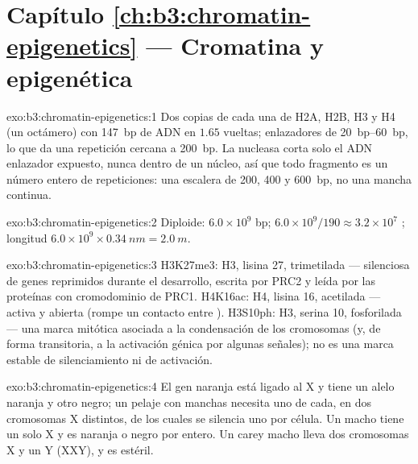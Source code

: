 \section*{Capítulo \ref{ch:b3:chromatin-epigenetics} --- Cromatina y epigenética}

\begin{solution}{exo:b3:chromatin-epigenetics:1}
Dos copias de cada una de H2A, H2B, H3 y H4 (un octámero) con
\qty{147}{bp} de ADN en $1.65$ vueltas; enlazadores de
\qtyrange{20}{60}{bp}, lo que da una repetición cercana a \qty{200}{bp}.
La nucleasa corta solo el ADN enlazador expuesto, nunca dentro de un
núcleo, así que todo fragmento es un número entero de repeticiones: una
escalera de \num{200}, \num{400} y \qty{600}{bp}, no una mancha continua.
\end{solution}

\begin{solution}{exo:b3:chromatin-epigenetics:2}
Diploide: $6.0\times 10^{9}$ bp; $6.0\times 10^{9}/190 \approx
3.2\times 10^{7}$ ; longitud $6.0\times 10^{9}\times
\qty{0.34}{nm} = \qty{2.0}{m}$.
\end{solution}

\begin{solution}{exo:b3:chromatin-epigenetics:3}
H3K27me3:  H3, lisina 27, trimetilada ---  silenciosa de
genes reprimidos durante el desarrollo, escrita por PRC2 y leída por las
proteínas con cromodominio de PRC1. H4K16ac: H4, lisina 16, acetilada ---
 activa y abierta (rompe un contacto entre ).
H3S10ph: H3, serina 10, fosforilada --- una marca mitótica asociada a la
condensación de los cromosomas (y, de forma transitoria, a la activación
génica por algunas señales); no es una marca estable de silenciamiento ni
de activación.
\end{solution}

\begin{solution}{exo:b3:chromatin-epigenetics:4}
El gen naranja está ligado al X y tiene un alelo naranja y otro negro; un
pelaje con manchas necesita uno de cada, en dos cromosomas X distintos,
de los cuales se silencia uno por célula. Un macho tiene un solo X y es
naranja o negro por entero. Un carey macho lleva dos cromosomas X y un Y
(XXY), y es estéril.
\end{solution}

